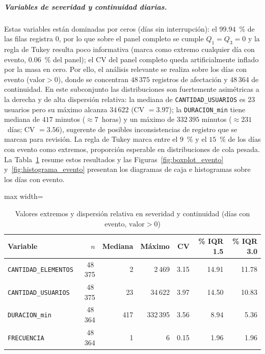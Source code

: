     
    
    \subparagraph{Variables de severidad y continuidad diarias.} Estas variables están dominadas por ceros (días sin interrupción): el $99{.}94$~\% de las filas registra $0$, por lo que sobre el panel completo se cumple $Q_1 = Q_3 = 0$ y la regla de Tukey resulta poco informativa (marca como extremo cualquier día con evento, $0{.}06$~\% del panel); el CV del panel completo queda artificialmente inflado por la masa en cero. Por ello, el análisis relevante se realiza sobre los días con evento ($\text{valor} > 0$), donde se concentran $48\,375$ registros de afectación y $48\,364$ de continuidad. En este subconjunto las distribuciones son fuertemente asimétricas a la derecha y de alta dispersión relativa: la mediana de \texttt{CANTIDAD\_USUARIOS} es $23$ usuarios pero su máximo alcanza $34\,622$ (CV $= 3{.}97$); la \texttt{DURACION\_min} tiene mediana de $417$ minutos ($\approx 7$~horas) y un máximo de $332\,395$ minutos ($\approx 231$~días; CV $= 3{.}56$), sugerente de posibles inconsistencias de registro que se marcan para revisión. La regla de Tukey marca entre el $9$~\% y el $15$~\% de los días con evento como extremos, proporción esperable en distribuciones de cola pesada. La Tabla~\ref{tab:extremos_evento} resume estos resultados y las Figuras~\ref{fig:boxplot_evento} y~\ref{fig:histograma_evento} presentan los diagramas de caja e histogramas sobre los días con evento.
    
    \begin{table}[!htbp]
    \centering
    \small
    \caption{Valores extremos y dispersión relativa en severidad y continuidad (días con evento, $\text{valor} > 0$)}
    \label{tab:extremos_evento}
    \begin{adjustbox}{max width=\linewidth}
\begin{tabular}{l r r r r r r}
    \toprule
    \textbf{Variable} & \textbf{$n$} & \textbf{Mediana} & \textbf{Máximo} & \textbf{CV} & \textbf{\% IQR 1.5} & \textbf{\% IQR 3.0} \\
    \midrule
    \texttt{CANTIDAD\_ELEMENTOS} & 48\,375 & 2   & 2\,469   & 3.15 & 14.91 & 11.78 \\
    \texttt{CANTIDAD\_USUARIOS}  & 48\,375 & 23  & 34\,622  & 3.97 & 14.50 & 10.83 \\
    \texttt{DURACION\_min}  & 48\,364 & 417 & 332\,395 & 3.56 & 8.94  & 5.36  \\
    \texttt{FRECUENCIA}          & 48\,364 & 1   & 6         & 0.15 & 1.96  & 1.96  \\
\bottomrule
    \end{tabular}
\end{adjustbox}
    \end{table}
    
